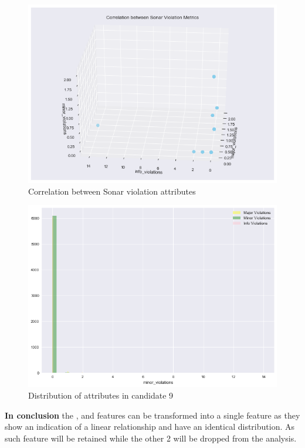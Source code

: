 \begin{enumerate}
\begin{figure}[!h]
    \centering
    \includegraphics[scale=0.6]{Figures/three-d/Correlation_between_attributes_major_violations_info_violations_minor_violations.png}
    \caption{Correlation between Sonar violation attributes}
    \label{fig:3d:candidate9-relationship}
\end{figure}

\begin{figure}
    \centering
    \includegraphics[scale=0.6]{Figures/correlation/Attribute_Distribution_in_Candidate_9.png}
    \caption{Distribution of attributes in candidate 9}
    \label{fig:candidate9-distribution}
\end{figure}

\textbf{In conclusion} the \openIssues{}, \codeSmells{} and \violations{} features can be transformed into a single feature as they show an indication of a linear relationship and have an identical distribution. As such \violations{} feature will be retained while the other 2 will be dropped from the analysis.


\end{enumerate}
